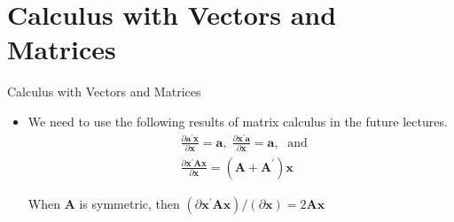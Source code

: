\documentclass[presentation]{beamer}
\begin{document}
\section{Calculus with Vectors and Matrices}
\label{sec:org126f85b}

\begin{frame}[label={sec:orgc9ac7a9}]{Calculus with Vectors and Matrices}
\begin{itemize}
\item We need to use the following results of matrix calculus in the future
lectures. 
\begin{align*}
& \frac{\partial \mathbf{a}^{\prime} \mathbf{x}}{\partial \mathbf{x}} = \mathbf{a},\; 
\frac{\partial \mathbf{x}^{\prime} \mathbf{a}}{\partial \mathbf{x}} = \mathbf{a},\; \text{ and } \\
& \frac{\partial \mathbf{x}^{\prime} \mathbf{A} \mathbf{x}}{\partial \mathbf{x}} = (\mathbf{A} + \mathbf{A}^{\prime}) \mathbf{x}
\end{align*}

When \(\mathbf{A}\) is symmetric, then \((\partial \mathbf{x}^{\prime}
  \mathbf{A} \mathbf{x}) / (\partial \mathbf{x}) = 2\mathbf{A}
  \mathbf{x}\)
\end{itemize}
\end{frame}
\end{document}
